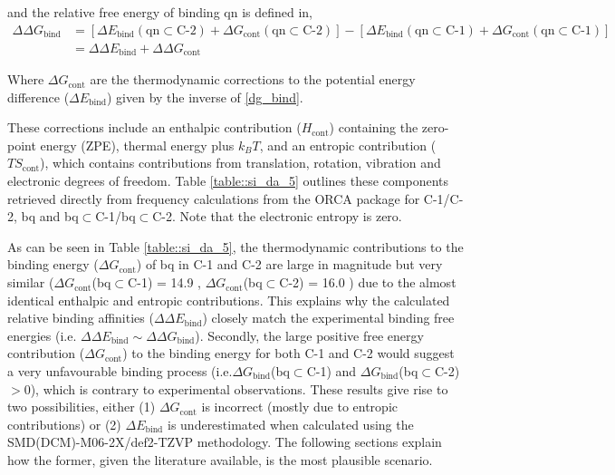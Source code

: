 \documentclass[../../main.tex]{subfiles}
\begin{document}
and the relative free energy of binding qn is defined in,
\begin{equation}
	\begin{aligned}
		\Delta\Delta G_\text{bind} &= [\Delta E_\text{bind} (\text{qn}\subset\text{C-2}) + \Delta G_\text{cont} (\text{qn}\subset\text{C-2})] - [\Delta E_\text{bind} (\text{qn}\subset\text{C-1})  + \Delta G_\text{cont} (\text{qn}\subset\text{C-1})] \\
		&= \Delta\Delta E_\text{bind}  + \Delta\Delta G_\text{cont}
	\end{aligned}	
\end{equation}


Where $\Delta G_\text{cont}$ are the thermodynamic corrections to the potential energy difference ($\Delta E_\text{bind}$) given by the inverse of \eqref{dg_bind}.

These corrections include an enthalpic contribution ($H_\text{cont}$) containing the zero-point energy (ZPE), thermal energy plus $k_BT$, and an entropic contribution ($TS_\text{cont}$), which contains contributions from translation, rotation, vibration and electronic degrees of freedom. Table \ref{table::si_da_5} outlines these components retrieved directly from frequency calculations from the ORCA package for C-1/C-2, bq and bq$\subset$C-1/bq$\subset$C-2. Note that the electronic entropy is zero.

As can be seen in Table \ref{table::si_da_5}, the thermodynamic contributions to the binding energy ($\Delta G_\text{cont}$) of bq in C-1 and C-2 are large in magnitude but very similar ($\Delta G_\text{cont}$(bq$\subset$C-1) = 14.9 \kcal, $\Delta G_\text{cont}$(bq$\subset$C-2) = 16.0 \kcal) due to the almost identical enthalpic and entropic contributions. This explains why the calculated relative binding affinities ($\Delta\Delta E_\text{bind}$) closely match the experimental binding free energies (i.e. $\Delta\Delta E_\text{bind} \sim \Delta\Delta G_\text{bind}$). Secondly, the large positive free energy contribution ($\Delta G_\text{cont}$) to the binding energy for both C-1 and C-2 would suggest a very unfavourable binding process (i.e.$\Delta G_\text{bind}$(bq$\subset$C-1) and $\Delta G_\text{bind}$(bq$\subset$C-2) $> 0$), which is contrary to experimental observations. These results give rise to two possibilities, either (1) $\Delta G_\text{cont}$ is incorrect (mostly due to entropic contributions) or (2) $\Delta E_\text{bind}$ is underestimated when calculated using the SMD(DCM)-M06-2X/def2-TZVP methodology. The following sections explain how the former, given the literature available, is the most plausible scenario.
\end{document}
